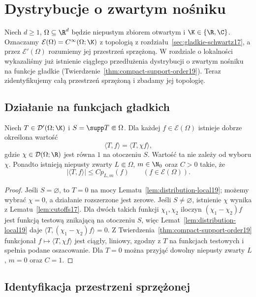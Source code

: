 \section{Dystrybucje o zwartym nośniku}
\providecommand{\atlasref}[2]{#2}

Niech $d\ge1$, $\Omega\subseteq\R^d$ będzie niepustym
zbiorem otwartym i $\K\in\{\R,\C\}$.
Oznaczamy $\mathcal E(\Omega)=C^\infty(\Omega;\K)$
z topologią z rozdziału~\ref{sec:gladkie-schwartz17},
a przez $\mathcal E'(\Omega)$ rozumiemy jej przestrzeń
sprzężoną. W rozdziale o lokalności wykazaliśmy już
istnienie ciągłego przedłużenia dystrybucji o zwartym
nośniku na funkcje gładkie
(Twierdzenie~\ref{thm:compact-support-order19}).
Teraz zidentyfikujemy całą przestrzeń sprzężoną
i zbadamy jej topologię.

\subsection{Działanie na funkcjach gładkich}

\begin{lemat}
\label{lem:compact-action21}
Niech $T\in\mathcal D'(\Omega;\K)$ i
$S=\supp T\Subset\Omega$. Dla każdej
$f\in\mathcal E(\Omega)$ istnieje dobrze określona wartość
\[
 \langle T,f\rangle=\langle T,\chi f\rangle,
\]
gdzie $\chi\in\mathcal D(\Omega;\R)$ jest równa $1$
na otoczeniu $S$. Wartość ta nie zależy od wyboru $\chi$.
Ponadto istnieją niepusty zwarty $L\Subset\Omega$,
$m\in\N_0$ oraz $C>0$ takie, że
\[
 |\langle T,f\rangle|\le C p_{L,m}(f)
 \qquad(f\in\mathcal E(\Omega)).
\]
\end{lemat}
\begin{proof}
Jeśli $S=\varnothing$, to $T=0$ na mocy
Lematu~\ref{lem:distribution-local19}; możemy wybrać
$\chi=0$, a działanie rozszerzone jest zerowe.
Jeśli $S\ne\varnothing$, istnienie $\chi$ wynika
z Lematu~\ref{lem:cutoffs17}.
Dla dwóch takich funkcji $\chi_1,\chi_2$ iloczyn
$(\chi_1-\chi_2)f$ jest funkcją testową znikającą
na otoczeniu $S$, więc Lemat~\ref{lem:distribution-local19}
daje $\langle T,(\chi_1-\chi_2)f\rangle=0$.
Z Twierdzenia~\ref{thm:compact-support-order19}
funkcjonał $f\mapsto\langle T,\chi f\rangle$ jest
ciągły, liniowy, zgodny z $T$ na funkcjach testowych
i spełnia podane oszacowanie. Dla $T=0$ można przyjąć
dowolny niepusty zwarty $L$, $m=0$ oraz $C=1$.
\end{proof}

\subsection{Identyfikacja przestrzeni sprzężonej}

